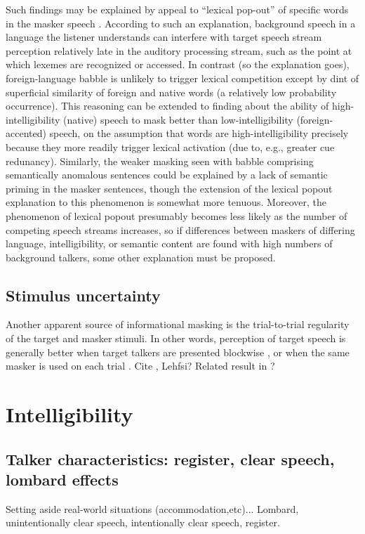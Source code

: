 Such findings may be explained by appeal to “lexical pop-out” of specific words in the masker speech \citep{HoenEtAl2007,BoulengerEtAl2010}.  According to such an explanation, background speech in a language the listener understands can interfere with target speech stream perception relatively late in the auditory processing stream, such as the point at which lexemes are recognized or accessed.  In contrast (so the explanation goes), foreign-language babble is unlikely to trigger lexical competition except by dint of superficial similarity of foreign and native words (a relatively low probability occurrence).  This reasoning can be extended to \citeauthor[’s]{CalandruccioEtAl2010} finding about the ability of high-intelligibility (native) speech to mask better than low-intelligibility (foreign-accented) speech, on the assumption that words are high-intelligibility precisely because they more readily trigger lexical activation (due to, e.g., greater cue redunancy).  Similarly, the weaker masking seen with babble comprising semantically anomalous sentences could be explained by a lack of semantic priming in the masker sentences, though the extension of the lexical popout explanation to this phenomenon is somewhat more tenuous.  Moreover, the phenomenon of lexical popout presumably becomes less likely as the number of competing speech streams increases, so if differences between maskers of differing language, intelligibility, or semantic content are found with high numbers of background talkers, some other explanation must be proposed.
 

\subsection{Stimulus uncertainty}
Another apparent source of informational masking is the trial-to-trial regularity of the target and masker stimuli.  In other words, perception of target speech is generally better when target talkers are presented blockwise \citep{xxx}, or when the same masker is used on each trial \citep{xxx}.  Cite \citep{Watson2005}, Lehfsi?  Related result in \citep{VanEngen2012}?


\section{Intelligibility}

\subsection{Talker characteristics: register, clear speech, lombard effects}
Setting aside real-world situations (accommodation,etc)...  Lombard, unintentionally clear speech, intentionally clear speech, register.

